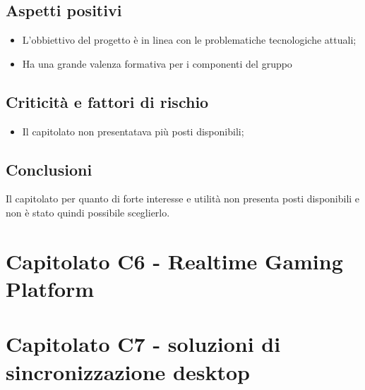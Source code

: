 \documentclass[a4paper]{article}
\begin{document}
\subsection{Aspetti positivi}
\begin{itemize}
    \item L'obbiettivo del progetto è in linea con le problematiche tecnologiche attuali;
    \item Ha una grande valenza formativa per i componenti del gruppo
\end{itemize}
\subsection{Criticità e fattori di rischio}
\begin{itemize}
    \item Il capitolato non presentatava più posti disponibili;
\end{itemize}
\subsection{Conclusioni}
Il capitolato per quanto di forte interesse e utilità non presenta posti disponibili e non è stato quindi possibile sceglierlo.
\section{Capitolato C6 - Realtime Gaming Platform}
\section{Capitolato C7 - soluzioni di sincronizzazione desktop}
\end{document}

